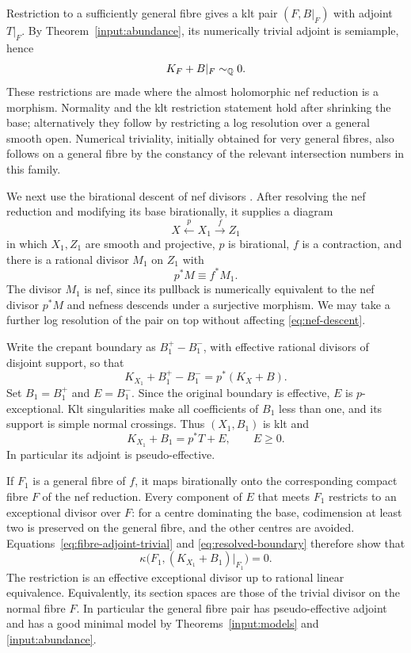 Restriction to a sufficiently general fibre gives a klt pair
$(F,B|_F)$ with adjoint $T|_F$.  By
Theorem~\ref{input:abundance}, its numerically trivial adjoint is
semiample, hence
\begin{equation}\label{eq:fibre-adjoint-trivial}
                         K_F+B|_F\sim_\mathbb Q0.
\end{equation}
These restrictions are made where the almost holomorphic nef
reduction is a morphism.  Normality and the klt restriction statement
hold after shrinking the base; alternatively they follow by
restricting a log resolution over a general smooth open.  Numerical
triviality, initially obtained for very general fibres, also follows
on a general fibre by the constancy of the relevant intersection
numbers in this family.

We next use the birational descent of nef divisors
\cite[Lemma 3.1]{LP}.  After resolving the nef reduction and modifying
its base birationally, it supplies a diagram
\[
                       X\xleftarrow{p}X_1\xrightarrow{f}Z_1
\]
in which $X_1,Z_1$ are smooth and projective, $p$ is birational,
$f$ is a contraction, and there is a rational divisor $M_1$ on
$Z_1$ with
\begin{equation}\label{eq:nef-descent}
                              p^*M\equiv f^*M_1.
\end{equation}
The divisor $M_1$ is nef, since its pullback is numerically
equivalent to the nef divisor $p^*M$ and nefness descends under a
surjective morphism.  We may take a further log resolution of the
pair on top without affecting \eqref{eq:nef-descent}.

Write the crepant boundary as $B_1^+-B_1^-$, with effective rational
divisors of disjoint support, so that
\[
                   K_{X_1}+B_1^+-B_1^-=p^*(K_X+B).
\]
Set $B_1=B_1^+$ and $E=B_1^-$.  Since the original boundary is
effective, $E$ is $p$-exceptional.  Klt singularities make all
coefficients of $B_1$ less than one, and its support is simple normal
crossings.  Thus $(X_1,B_1)$ is klt and
\begin{equation}\label{eq:resolved-boundary}
                    K_{X_1}+B_1=p^*T+E,\qquad E\geq0.
\end{equation}
In particular its adjoint is pseudo-effective.

If $F_1$ is a general fibre of $f$, it maps birationally onto the
corresponding compact fibre $F$ of the nef reduction.  Every
component of $E$ that meets $F_1$ restricts to an exceptional divisor
over $F$: for a centre dominating the base, codimension at least two
is preserved on the general fibre, and the other centres are avoided.
Equations~\eqref{eq:fibre-adjoint-trivial} and
\eqref{eq:resolved-boundary} therefore show that
\begin{equation}\label{eq:fibre-kappa-zero}
               \kappa\bigl(F_1,(K_{X_1}+B_1)|_{F_1}\bigr)=0.
\end{equation}
The restriction is an effective exceptional divisor up to rational
linear equivalence.  Equivalently, its section spaces are those of
the trivial divisor on the normal fibre $F$.  In particular the
general fibre pair has pseudo-effective adjoint and has a good
minimal model by Theorems~\ref{input:models} and
\ref{input:abundance}.

